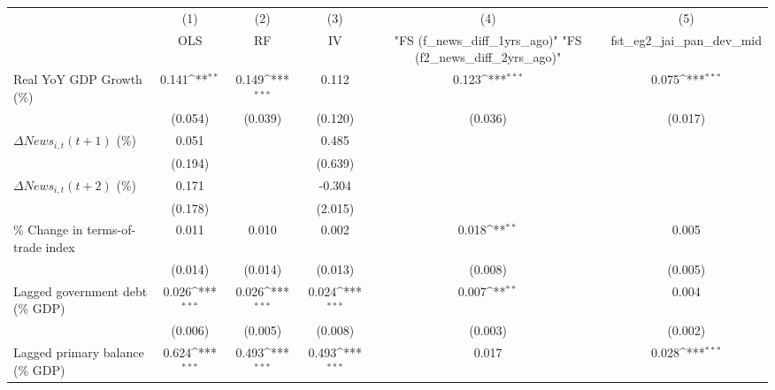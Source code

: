 {
\def\sym#1{\ifmmode^{#1}\else\(^{#1}\)\fi}
\begin{tabular}{l*{5}{c}}
\toprule
                    &\multicolumn{1}{c}{(1)}&\multicolumn{1}{c}{(2)}&\multicolumn{1}{c}{(3)}&\multicolumn{1}{c}{(4)}&\multicolumn{1}{c}{(5)}\\
                    &\multicolumn{1}{c}{OLS}&\multicolumn{1}{c}{RF}&\multicolumn{1}{c}{IV}&\multicolumn{1}{c}{ "FS (f_news_diff_1yrs_ago)"  "FS (f2_news_diff_2yrs_ago)" }&\multicolumn{1}{c}{fst_eg2_jai_pan_dev_mid}\\
\midrule
Real YoY GDP Growth (\%)&       0.141\sym{**} &       0.149\sym{***}&       0.112         &       0.123\sym{***}&       0.075\sym{***}\\
                    &     (0.054)         &     (0.039)         &     (0.120)         &     (0.036)         &     (0.017)         \\
\addlinespace
$ \Delta News_{i,t}(t+1)$ (\%)&       0.051         &                     &       0.485         &                     &                     \\
                    &     (0.194)         &                     &     (0.639)         &                     &                     \\
\addlinespace
$ \Delta News_{i,t}(t+2)$ (\%)&       0.171         &                     &      -0.304         &                     &                     \\
                    &     (0.178)         &                     &     (2.015)         &                     &                     \\
\addlinespace
\% Change in terms-of-trade index&       0.011         &       0.010         &       0.002         &       0.018\sym{**} &       0.005         \\
                    &     (0.014)         &     (0.014)         &     (0.013)         &     (0.008)         &     (0.005)         \\
\addlinespace
Lagged government debt (\% GDP)&       0.026\sym{***}&       0.026\sym{***}&       0.024\sym{***}&       0.007\sym{**} &       0.004         \\
                    &     (0.006)         &     (0.005)         &     (0.008)         &     (0.003)         &     (0.002)         \\
\addlinespace
Lagged primary balance (\% GDP)&       0.624\sym{***}&       0.493\sym{***}&       0.493\sym{***}&       0.017         &       0.028\sym{***}\\

\end{tabular}}
